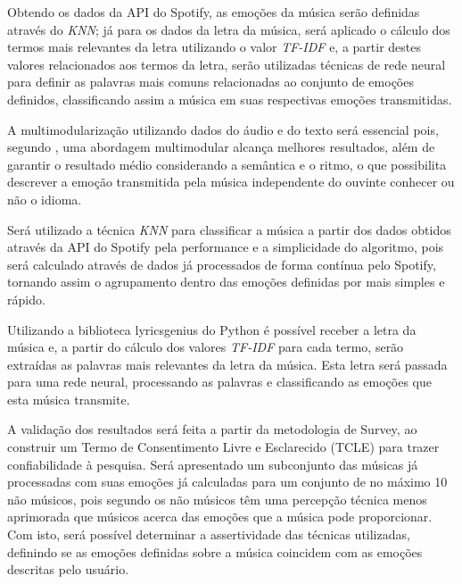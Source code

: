 \documentclass[
	12pt,				%
	openright,			%
	oneside,
	a4paper,			%
	english,			%
	french,				%
	spanish,			%
	brazil				%
	]{abntex2}
\begin{document}
    Obtendo os dados da API do Spotify, as emoções da música serão definidas através do \textit{KNN}; já para os dados da letra da música, será aplicado o cálculo dos termos mais relevantes da letra utilizando o valor \textit{TF-IDF} e, a partir destes valores relacionados aos termos da letra, serão utilizadas técnicas de rede neural para definir as palavras mais comuns relacionadas ao conjunto de emoções definidos, classificando assim a música em suas respectivas emoções transmitidas.
    
    A multimodularização utilizando dados do áudio e do texto será essencial pois, segundo , uma abordagem multimodular alcança melhores resultados, além de garantir o resultado médio considerando a semântica e o ritmo, o que possibilita descrever a emoção transmitida pela música independente do ouvinte conhecer ou não o idioma. 
    
    Será utilizado a técnica \textit{KNN} para classificar a música a partir dos dados obtidos através da API do Spotify pela performance e a simplicidade do algoritmo, pois será calculado através de dados já processados de forma contínua pelo Spotify, tornando assim o agrupamento dentro das emoções definidas por  mais simples e rápido. 
    
    Utilizando a biblioteca lyricsgenius do Python é possível receber a letra da música e, a partir do cálculo dos valores \textit{TF-IDF} para cada termo, serão extraídas as palavras mais relevantes da letra da música. Esta letra será passada para uma rede neural, processando as palavras e classificando as emoções que esta música transmite.
    
    A validação dos resultados será feita a partir da metodologia de Survey, ao construir um Termo de Consentimento Livre e Esclarecido (TCLE) para trazer confiabilidade à pesquisa. Será apresentado um subconjunto das músicas já processadas com suas emoções já calculadas para um conjunto de no máximo 10 não músicos, pois segundo   os não músicos têm uma percepção técnica menos aprimorada que músicos acerca das emoções que a música pode proporcionar. Com isto, será possível determinar a assertividade das técnicas utilizadas, definindo se as emoções definidas sobre a música coincidem com as emoções descritas pelo usuário. 


\postextual

{}

\end{document}
